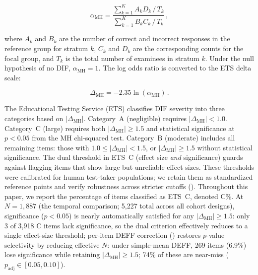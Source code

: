 \begin{equation}
\label{eq:mh}
\alpha_{\mathrm{MH}} = \frac{\displaystyle\sum_{k=1}^{K} A_k D_k \,/\, T_k}{\displaystyle\sum_{k=1}^{K} B_k C_k \,/\, T_k}\,,
\end{equation}

\noindent where $A_k$ and $B_k$ are the number of correct and incorrect responses in the reference group for stratum $k$, $C_k$ and $D_k$ are the corresponding counts for the focal group, and $T_k$ is the total number of examinees in stratum $k$. Under the null hypothesis of no DIF, $\alpha_{\mathrm{MH}} = 1$. The log odds ratio is converted to the ETS delta scale:

\begin{equation}
\label{eq:delta}
\Delta_{\mathrm{MH}} = -2.35 \ln(\alpha_{\mathrm{MH}})\,.
\end{equation}

The Educational Testing Service (ETS) classifies DIF severity into three categories based on $|\Delta_{\mathrm{MH}}|$. Category~A (negligible) requires $|\Delta_{\mathrm{MH}}| < 1.0$. Category~C (large) requires both $|\Delta_{\mathrm{MH}}| \geq 1.5$ and statistical significance at $p < 0.05$ from the MH chi-squared test. Category~B (moderate) includes all remaining items: those with $1.0 \leq |\Delta_{\mathrm{MH}}| < 1.5$, or $|\Delta_{\mathrm{MH}}| \geq 1.5$ without statistical significance. The dual threshold in ETS~C (effect size \emph{and} significance) guards against flagging items that show large but unreliable effect sizes. These thresholds were calibrated for human test-taker populations; we retain them as standardized reference points and verify robustness across stricter cutoffs (). Throughout this paper, we report the percentage of items classified as ETS~C, denoted C\%. At $N = 1{,}887$ (the temporal comparison; 5{,}227 total across all cohort designs), significance ($p < 0.05$) is nearly automatically satisfied for any $|\Delta_{\mathrm{MH}}| \geq 1.5$: only 3 of 3{,}918 C items lack significance, so the dual criterion effectively reduces to a single effect-size threshold; per-item DEFF correction () restores $p$-value selectivity by reducing effective $N$: under simple-mean DEFF, 269 items (6.9\%) lose significance while retaining $|\Delta_{\mathrm{MH}}| \geq 1.5$; 74\% of these are near-miss ($p_{\mathrm{adj}} \in [0.05, 0.10]$).

